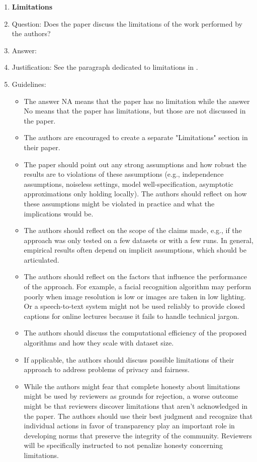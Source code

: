 \begin{enumerate}
\item {\bf Limitations}
\item[] Question: Does the paper discuss the limitations of the work performed by the authors?
\item[] Answer: \answerYes{}
\item[] Justification: See the paragraph dedicated to limitations in .
\item[] Guidelines:
  \begin{itemize}
  \item The answer NA means that the paper has no limitation while the answer No means that the paper has limitations, but those are not discussed in the paper.
  \item The authors are encouraged to create a separate "Limitations" section in their paper.
  \item The paper should point out any strong assumptions and how robust the results are to violations of these assumptions (e.g., independence assumptions, noiseless settings, model well-specification, asymptotic approximations only holding locally). The authors should reflect on how these assumptions might be violated in practice and what the implications would be.
  \item The authors should reflect on the scope of the claims made, e.g., if the approach was only tested on a few datasets or with a few runs. In general, empirical results often depend on implicit assumptions, which should be articulated.
  \item The authors should reflect on the factors that influence the performance of the approach. For example, a facial recognition algorithm may perform poorly when image resolution is low or images are taken in low lighting. Or a speech-to-text system might not be used reliably to provide closed captions for online lectures because it fails to handle technical jargon.
  \item The authors should discuss the computational efficiency of the proposed algorithms and how they scale with dataset size.
  \item If applicable, the authors should discuss possible limitations of their approach to address problems of privacy and fairness.
  \item While the authors might fear that complete honesty about limitations might be used by reviewers as grounds for rejection, a worse outcome might be that reviewers discover limitations that aren't acknowledged in the paper. The authors should use their best judgment and recognize that individual actions in favor of transparency play an important role in developing norms that preserve the integrity of the community. Reviewers will be specifically instructed to not penalize honesty concerning limitations.
  \end{itemize}


\end{enumerate}
